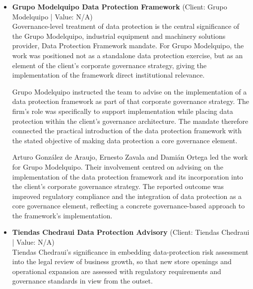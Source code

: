 \documentclass[11pt]{article}
\begin{document}
\begin{itemize}
The engagement centred on converting the data-protection focus of the regularisation exercise into implemented internal measures. Arturo González de Araujo, Ernesto Zavala and Damián Ortega led the work, designing and implementing internal policies and training programmes. Their role therefore extended beyond identifying data-protection issues: the team developed the internal policies required for the restructured operations and implemented training programmes intended to support their internal application during the regularisation process.

The resulting policies and training programmes formed a concrete part of Grupo Excelsior’s operational regularisation and restructuring. For Grupo Excelsior, significantly strengthening compliance posture and reducing regulatory exposure was the stated outcome of the team’s design and implementation work. The matter provides submission evidence of the team’s role in linking data-protection policy design, training programmes and the regularisation and restructuring of operations.
\item \textbf{Grupo Modelquipo Data Protection Framework} (Client: Grupo Modelquipo | Value: N/A)\\ Governance-level treatment of data protection is the central significance of the Grupo Modelquipo, industrial equipment and machinery solutions provider, Data Protection Framework mandate. For Grupo Modelquipo, the work was positioned not as a standalone data protection exercise, but as an element of the client’s corporate governance strategy, giving the implementation of the framework direct institutional relevance.

Grupo Modelquipo instructed the team to advise on the implementation of a data protection framework as part of that corporate governance strategy. The firm’s role was specifically to support implementation while placing data protection within the client’s governance architecture. The mandate therefore connected the practical introduction of the data protection framework with the stated objective of making data protection a core governance element.

Arturo González de Araujo, Ernesto Zavala and Damián Ortega led the work for Grupo Modelquipo. Their involvement centred on advising on the implementation of the data protection framework and its incorporation into the client’s corporate governance strategy. The reported outcome was improved regulatory compliance and the integration of data protection as a core governance element, reflecting a concrete governance-based approach to the framework’s implementation.
\item \textbf{Tiendas Chedraui Data Protection Advisory} (Client: Tiendas Chedraui | Value: N/A)\\ Tiendas Chedraui's significance in embedding data-protection risk assessment into the legal review of business growth, so that new store openings and operational expansion are assessed with regulatory requirements and governance standards in view from the outset.


\end{itemize}
\end{document}
